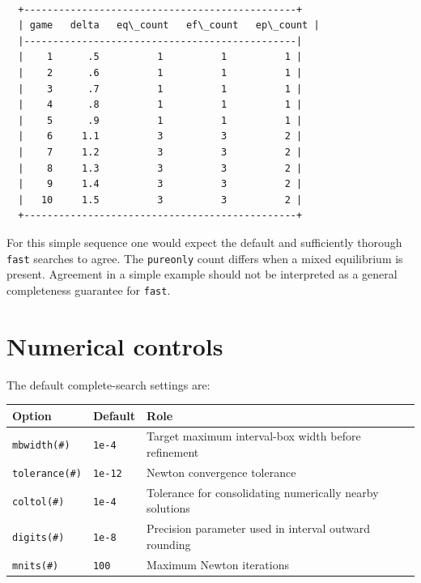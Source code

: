 \documentclass[11pt]{article}
\begin{document}
    \begin{Verbatim}[commandchars=\\\{\}]

  +-----------------------------------------------+
  | game   delta   eq\_count   ef\_count   ep\_count |
  |-----------------------------------------------|
  |    1      .5          1          1          1 |
  |    2      .6          1          1          1 |
  |    3      .7          1          1          1 |
  |    4      .8          1          1          1 |
  |    5      .9          1          1          1 |
  |    6     1.1          3          3          2 |
  |    7     1.2          3          3          2 |
  |    8     1.3          3          3          2 |
  |    9     1.4          3          3          2 |
  |   10     1.5          3          3          2 |
  +-----------------------------------------------+
    \end{Verbatim}

    For this simple sequence one would expect the default and sufficiently
thorough \texttt{fast} searches to agree. The \texttt{pureonly} count
differs when a mixed equilibrium is present. Agreement in a simple
example should not be interpreted as a general completeness guarantee
for \texttt{fast}.

    \section{Numerical controls}\label{numerical-controls}

The default complete-search settings are:

{\def\LTcaptype{none} %
\begin{longtable}[]{@{}
  >{\raggedright\arraybackslash}p{}
  >{\raggedleft\arraybackslash}p{}
  >{\raggedright\arraybackslash}p{}@{}}
\toprule\noalign{}
\begin{minipage}[b]{\linewidth}\raggedright
Option
\end{minipage} & \begin{minipage}[b]{\linewidth}\raggedleft
Default
\end{minipage} & \begin{minipage}[b]{\linewidth}\raggedright
Role
\end{minipage} \\
\midrule\noalign{}
\endhead
\bottomrule\noalign{}
\endlastfoot
\texttt{mbwidth(\#)} & \texttt{1e-4} & Target maximum interval-box width
before refinement \\
\texttt{tolerance(\#)} & \texttt{1e-12} & Newton convergence
tolerance \\
\texttt{coltol(\#)} & \texttt{1e-4} & Tolerance for consolidating
numerically nearby solutions \\
\texttt{digits(\#)} & \texttt{1e-8} & Precision parameter used in
interval outward rounding \\
\texttt{mnits(\#)} & \texttt{100} & Maximum Newton iterations \\
\end{longtable}
}
\end{document}
